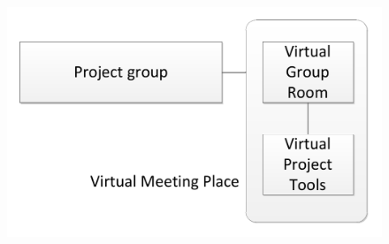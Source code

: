 \begin{frame}{\modelreality}{\topicfour} 
\begin{figure}
\includegraphics[width=\columnwidth]{input/rasmus/two11.pdf}
\end{figure}
\end{frame}